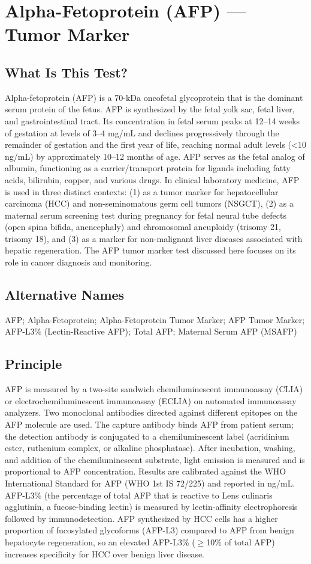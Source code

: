 \chapter{Alpha-Fetoprotein (AFP) --- Tumor Marker}

\section*{What Is This Test?}
Alpha-fetoprotein (AFP) is a 70-kDa oncofetal glycoprotein that is the dominant serum protein of the fetus. AFP is synthesized by the fetal yolk sac, fetal liver, and gastrointestinal tract. Its concentration in fetal serum peaks at 12--14 weeks of gestation at levels of 3--4 mg/mL and declines progressively through the remainder of gestation and the first year of life, reaching normal adult levels (<10 ng/mL) by approximately 10--12 months of age. AFP serves as the fetal analog of albumin, functioning as a carrier/transport protein for ligands including fatty acids, bilirubin, copper, and various drugs. In clinical laboratory medicine, AFP is used in three distinct contexts: (1) as a tumor marker for hepatocellular carcinoma (HCC) and non-seminomatous germ cell tumors (NSGCT), (2) as a maternal serum screening test during pregnancy for fetal neural tube defects (open spina bifida, anencephaly) and chromosomal aneuploidy (trisomy 21, trisomy 18), and (3) as a marker for non-malignant liver diseases associated with hepatic regeneration. The AFP tumor marker test discussed here focuses on its role in cancer diagnosis and monitoring.

\section*{Alternative Names}
AFP; Alpha-Fetoprotein; Alpha-Fetoprotein Tumor Marker; AFP Tumor Marker; AFP-L3\% (Lectin-Reactive AFP); Total AFP; Maternal Serum AFP (MSAFP)

\section*{Principle}
AFP is measured by a two-site sandwich chemiluminescent immunoassay (CLIA) or electrochemiluminescent immunoassay (ECLIA) on automated immunoassay analyzers. Two monoclonal antibodies directed against different epitopes on the AFP molecule are used. The capture antibody binds AFP from patient serum; the detection antibody is conjugated to a chemiluminescent label (acridinium ester, ruthenium complex, or alkaline phosphatase). After incubation, washing, and addition of the chemiluminescent substrate, light emission is measured and is proportional to AFP concentration. Results are calibrated against the WHO International Standard for AFP (WHO 1st IS 72/225) and reported in ng/mL. AFP-L3\% (the percentage of total AFP that is reactive to Lens culinaris agglutinin, a fucose-binding lectin) is measured by lectin-affinity electrophoresis followed by immunodetection. AFP synthesized by HCC cells has a higher proportion of fucosylated glycoforms (AFP-L3) compared to AFP from benign hepatocyte regeneration, so an elevated AFP-L3\% ($\geq$10\% of total AFP) increases specificity for HCC over benign liver disease.

